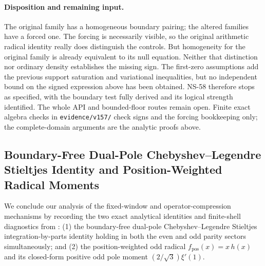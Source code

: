 \documentclass[11pt]{article}
\theoremstyle{remark}
\begin{document}
\paragraph{Disposition and remaining input.}
The original family has a homogeneous boundary pairing; the altered
families have a forced one. The forcing is necessarily visible, so
the original arithmetic radical identity really does distinguish the
controls. But homogeneity for the original family is already equivalent
to its null equation. Neither that distinction nor ordinary density
establishes the missing sign. The first-zero assumptions add the
previous support saturation and variational inequalities, but no
independent bound on the signed expression above has been obtained.
NS-58 therefore stops as specified, with the boundary test fully
derived and its logical strength identified. The whole API and
bounded-floor routes remain open. Finite exact algebra checks in
\texttt{evidence/v157/} check signs and the forcing bookkeeping only;
the complete-domain arguments are the analytic proofs above.




\subsection{Boundary-Free Dual-Pole Chebyshev--Legendre Stieltjes Identity and Position-Weighted Radical Moments}\label{subsec:dual-pole-bessel}

We conclude our analysis of the fixed-window and operator-compression mechanisms by recording the two exact analytical identities and finite-shell diagnostics from : (1) the boundary-free dual-pole Chebyshev--Legendre Stieltjes integration-by-parts identity holding in both the even and odd parity sectors simultaneously; and (2) the position-weighted odd radical $f_{\mathrm{pos}}(x)=x\,h(x)$ and its closed-form positive odd pole moment $(2/\sqrt{3})\xi'(1)$.
\end{document}
